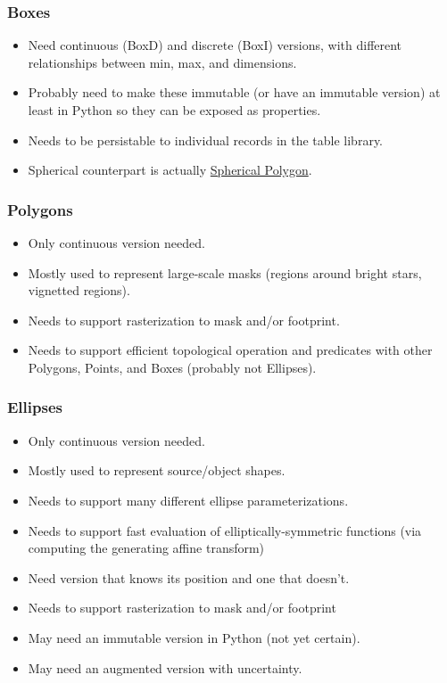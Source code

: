 \subsubsection{Boxes}
\label{sec:spCartesianBoxes}

\begin{itemize}
\item Need continuous (BoxD) and discrete (BoxI) versions, with different relationships between min, max, and dimensions.
\item Probably need to make these immutable (or have an immutable version) at least in Python so they can be exposed as properties.
\item Needs to be persistable to individual records in the table library.
\item Spherical counterpart is actually \hyperref[sec:spSphericalPolygons]{Spherical Polygon}.
\end{itemize}

\subsubsection{Polygons}
\label{sec:spCartesianPolygons}

\begin{itemize}
\item Only continuous version needed.
\item Mostly used to represent large-scale masks (regions around bright stars, vignetted regions).
\item Needs to support rasterization to mask and/or footprint.
\item Needs to support efficient topological operation and predicates with other Polygons, Points, and Boxes (probably not Ellipses).
\end{itemize}

\subsubsection{Ellipses}
\label{sec:spCartesianEllipses}

\begin{itemize}
\item Only continuous version needed.
\item Mostly used to represent source/object shapes.
\item Needs to support many different ellipse parameterizations.
\item Needs to support fast evaluation of elliptically-symmetric functions (via computing the generating affine transform)
\item Need version that knows its position and one that doesn't.
\item Needs to support rasterization to mask and/or footprint
\item May need an immutable version in Python (not yet certain).
\item May need an  augmented version with uncertainty.
\end{itemize}


